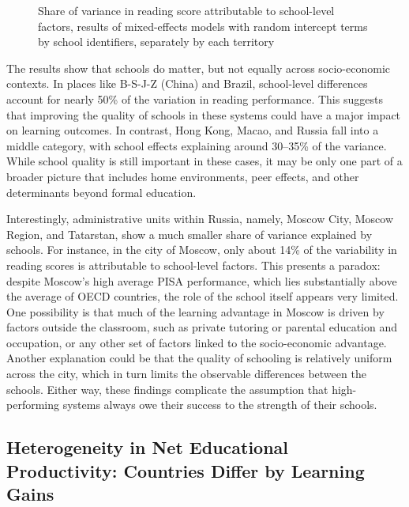 \documentclass[
]{article}
\begin{document}
\begin{figure}


\caption{\label{fig-mem-base-icc}Share of variance in reading score
attributable to school-level factors, results of mixed-effects models
with random intercept terms by school identifiers, separately by each
territory}

\end{figure}%

The results show that schools do matter, but not equally across
socio-economic contexts. In places like B-S-J-Z (China) and Brazil,
school-level differences account for nearly 50\% of the variation in
reading performance. This suggests that improving the quality of schools
in these systems could have a major impact on learning outcomes. In
contrast, Hong Kong, Macao, and Russia fall into a middle category, with
school effects explaining around 30--35\% of the variance. While school
quality is still important in these cases, it may be only one part of a
broader picture that includes home environments, peer effects, and other
determinants beyond formal education.

Interestingly, administrative units within Russia, namely, Moscow City,
Moscow Region, and Tatarstan, show a much smaller share of variance
explained by schools. For instance, in the city of Moscow, only about
14\% of the variability in reading scores is attributable to
school-level factors. This presents a paradox: despite Moscow's high
average PISA performance, which lies substantially above the average of
OECD countries, the role of the school itself appears very limited. One
possibility is that much of the learning advantage in Moscow is driven
by factors outside the classroom, such as private tutoring or parental
education and occupation, or any other set of factors linked to the
socio-economic advantage. Another explanation could be that the quality
of schooling is relatively uniform across the city, which in turn limits
the observable differences between the schools. Either way, these
findings complicate the assumption that high-performing systems always
owe their success to the strength of their schools.

\subsection{Heterogeneity in Net Educational Productivity: Countries
Differ by Learning Gains}\label{sec-learn-gains}
\end{document}
